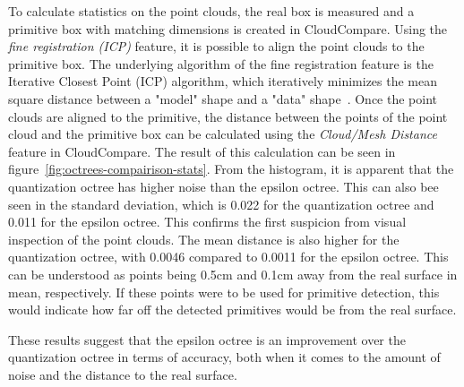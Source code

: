 To calculate statistics on the point clouds, the real box is measured and a primitive box with matching dimensions is created in CloudCompare.
Using the \textit{fine registration (ICP)} feature, it is possible to align the point clouds to the primitive box.
The underlying algorithm of the fine registration feature is the Iterative Closest Point (ICP) algorithm,
which iteratively minimizes the mean square distance between a "model" shape and a "data" shape~\cite{besl_method_1992}.
Once the point clouds are aligned to the primitive,
the distance between the points of the point cloud and the primitive box can be calculated using the \textit{Cloud/Mesh Distance} feature in CloudCompare.
The result of this calculation can be seen in figure~\ref{fig:octrees-compairison-stats}.
From the histogram, it is apparent that the quantization octree has higher noise than the epsilon octree.
This can also bee seen in the standard deviation, which is 0.022 for the quantization octree and 0.011
for the epsilon octree.
This confirms the first suspicion from visual inspection of the point clouds.
The mean distance is also higher for the quantization octree, with 0.0046 compared to 0.0011 for the epsilon octree.
This can be understood as points being 0.5cm and 0.1cm away from the real surface in mean, respectively.
If these points were to be used for primitive detection, this would indicate how far off the detected primitives would be from the real surface.

These results suggest that the epsilon octree is an improvement over the quantization octree in terms of accuracy,
both when it comes to the amount of noise and the distance to the real surface.


